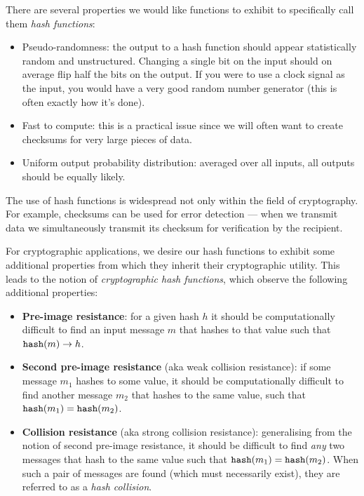 There are several properties we would like functions to exhibit to specifically call them \emph{hash functions}:
\begin{itemize}
	\item Pseudo-randomness: the output to a hash function should appear statistically random and unstructured. Changing a single bit on the input should on average flip half the bits on the output. If you were to use a clock signal as the input, you would have a very good random number generator (this is often exactly how it's done).
	\item Fast to compute: this is a practical issue since we will often want to create checksums for very large pieces of data.
	\item Uniform output probability distribution: averaged over all inputs, all outputs should be equally likely.
\end{itemize}

The use of hash functions is widespread not only within the field of cryptography. For example, checksums can be used for error detection --- when we transmit data we simultaneously transmit its checksum for verification by the recipient.

For cryptographic applications, we desire our hash functions to exhibit some additional properties from which they inherit their cryptographic utility. This leads to the notion of \emph{cryptographic hash functions}, which observe the following additional properties:
\begin{itemize}
	\item \textbf{Pre-image resistance}: for a given hash $h$ it should be computationally difficult to find an input message $m$ that hashes to that value such that ${\tt hash}(m)\to h$.
	\item \textbf{Second pre-image resistance} (aka weak collision resistance): if some message $m_1$ hashes to some value, it should be computationally difficult to find another message $m_2$ that hashes to the same value, such that ${\tt hash}(m_1)={\tt hash}(m_2)$.
	\item \textbf{Collision resistance} (aka strong collision resistance): generalising from the notion of second pre-image resistance, it should be difficult to find \emph{any} two messages that hash to the same value such that ${\tt hash}(m_1)={\tt hash}(m_2)$. When such a pair of messages are found (which must necessarily exist), they are referred to as a \emph{hash collision}.
\end{itemize}

